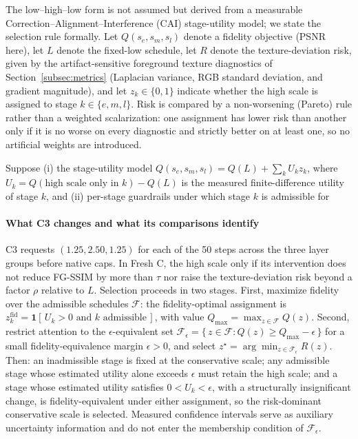 \documentclass[times,twocolumn,final]{elsarticle}
\providecommand{\DIFadd}[1]{{\protect\color{blue} \sf #1}} %
\providecommand{\DIFdel}[1]{{\protect\color{red} \scriptsize #1}} %
\providecommand{\DIFaddbegin}{} %
\providecommand{\DIFaddend}{} %
\providecommand{\DIFdelbegin}{} %
\providecommand{\DIFdelend}{} %
\begin{document}
\DIFdelbegin %
\DIFdel{The low--high--low form is not assumed but derived from a measurable Correction--Alignment--Interference (CAI) stage-utility model; we state the selection rule formally. Let $Q(s_e,s_m,s_l)$ denote a fidelity objective (PSNR here), let $L$ denote the fixed-low schedule, let $R$ denote the texture-deviation risk, given by the artifact-sensitive foreground texture diagnostics of Section~\ref{subsec:metrics} (Laplacian variance, RGB standard deviation, and gradient magnitude), and let $z_k\in\{0,1\}$ indicate whether the high scale is assigned to stage $k\in\{e,m,l\}$. Risk is compared by a non-worsening (Pareto) rule rather than a weighted scalarization: one assignment has lower risk than another only if it is no worse on every diagnostic and strictly better on at least one, so no artificial weights are introduced.
}%

\DIFdel{Suppose (i) the stage-utility model $Q(s_e,s_m,s_l)=Q(L)+\sum_{k}U_k z_k$, where $U_k=Q(\text{high scale only in }k)-Q(L)$ is the measured finite-difference utility of stage $k$, and (ii) per-stage guardrails under which stage $k$ is admissible for }\DIFdelend \DIFaddbegin \paragraph{What C3 changes and what its comparisons identify}
\DIFadd{C3 requests $(1.25,2.50,1.25)$ for each of the 50 steps across the three layer groups before native caps. In Fresh C, }\DIFaddend the \DIFdelbegin \DIFdel{high scale only if its intervention does not reduce FG-SSIM by more than $\tau$ nor raise the texture-deviation risk beyond a factor $\rho$ relative to $L$. Selection proceeds in two stages.
First, maximize fidelity over the admissible schedules $\mathcal{F}$: the fidelity-optimal assignment is $z_k^{\mathrm{fid}}=\mathbf{1}[\,U_k>0 \text{ and } k \text{ admissible}\,]$, with value $Q_{\max}=\max_{z\in\mathcal{F}}Q(z)$. Second, restrict attention to the $\epsilon$-equivalent set $\mathcal{F}_\epsilon=\{\,z\in\mathcal{F}: Q(z)\ge Q_{\max}-\epsilon\,\}$ for a small fidelity-equivalence margin $\epsilon>0$, and select $z^{\star}=\arg\min_{z\in\mathcal{F}_\epsilon}R(z)$. Then: an inadmissible stage is fixed at the conservative scale; any admissible stage whose estimated utility alone exceeds $\epsilon$ must retain the high scale; and a stage whose estimated utility satisfies $0<U_k<\epsilon$, with a structurally insignificant change, is fidelity-equivalent under either assignment, so the risk-dominant conservative scale is selected. Measured confidence intervals serve as auxiliary uncertainty information and do not enter the membership condition of $\mathcal{F}_\epsilon$. }%
\end{document}
